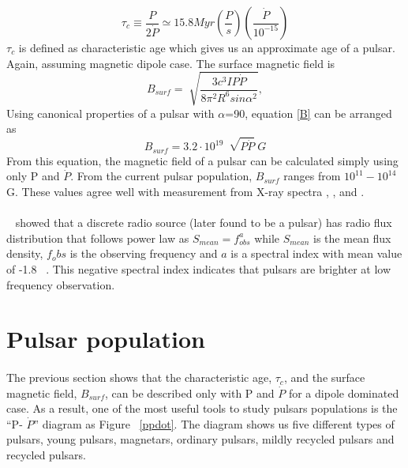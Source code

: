 \documentclass[thesis_msc.tex]{subfiles}
\begin{document}
   \begin{equation} \label{tc}
   \tau_c \equiv \frac{P}{2\dot{P}} \simeq 15.8 Myr (\frac{P}{s})(\frac{\dot{P}}{10^{-15}})
   \end{equation}
 $\tau_c$ is defined as characteristic age which gives us an approximate age of a pulsar. Again, assuming magnetic dipole case. The surface magnetic field is  
    \begin{equation}\label{B}
    B_{surf}=\sqrt[]{\frac{3c^3IP\dot{P}}{8\pi^2R^6sin \alpha^2}},
    \end{equation}
    Using canonical properties of a pulsar with $\alpha$=90, equation \ref{B} can be arranged as
    \begin{equation}
    B_{surf}=3.2\cdot10^{19}~\sqrt[]{P\dot{P}} ~ G
    \end{equation}
 From this equation, the magnetic field of a pulsar can be calculated simply using only P and $\dot{P}$. From the current pulsar population, $B_{surf}$ ranges from $10^{11}-10^{14}$ G. These values agree well with measurement from X-ray spectra \citep{coburn2002magnetic}, \citep{bignami2003magnetic}, and \citep{kouveliotou1998x}.  
    
\paragraph{} ~\cite{conway1962radio} showed that a discrete radio source (later found to be a pulsar) has radio flux distribution that follows power law as $S_{mean} = f^a_{obs}$ while $S_{mean}$ is the mean flux density, $f_obs$ is the observing frequency and $a$ is a spectral index with mean value of -1.8 ~\citep{maron2000pulsar}. This negative spectral index indicates that pulsars are brighter at low frequency observation.      
   
\section{Pulsar population} \label{pulsartype}
    \paragraph{} The previous section shows that the characteristic age, $\tau_c$, and the surface magnetic field, $B_{surf}$, can be described only with P and $\dot{P}$ for a dipole dominated case. As a result, one of the most useful tools to study pulsars populations is the ``P- $\dot{P}$'' diagram as Figure ~\ref{ppdot}.  The diagram shows us five different types of pulsars, young pulsars, magnetars, ordinary pulsars, mildly recycled pulsars and recycled pulsars. 
    
\end{document}
